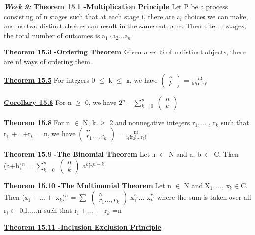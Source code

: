 \documentclass[10pt]{article}
\begin{document}
\par\textbf{\underline{\textit{Week 9:}}}
\textbf{\underline{Theorem 15.1 -Multiplication Principle }}
Let P be a process consisting of n stages such
that at each stage i, there are a$_i$ choices we can make, and no two distinct choices
can result in the same outcome. Then after n stages, the total number of outcomes is
a$_1 · \mbox{a}_2 \dots \mbox{a}_n$.
\par\textbf{\underline{Theorem 15.3 -Ordering Theorem }}
Given a set S of n distinct objects, there are n! ways
of ordering them.
\par\textbf{\underline{Theorem 15.5}}
For integers 0 $\leq$ k $\leq$ n, we have
$\left( \begin{array}{c} n \\ k \end{array} \right)$ = $\frac{\mbox{n}!}{\mbox{k!(n-k)!}}$
\par\textbf{\underline{Corollary 15.6}}
For n $\geq$ 0, we have
2$^n$= $\sum_{k=0}^{n}$ $\left( \begin{array}{c} n \\ k \end{array} \right)$
\par\textbf{\underline{Theorem 15.8}}
For n $\in$ N, k $\geq$ 2 and nonnegative integers r$_1, \dots$ , r$_k$ such that r$_1$ +$\dots$+r$_k$ = n,
we have $\left( \begin{array}{c} n \\ r_1 \dots ,r_k \end{array} \right)$ = $ \frac{\mbox{n!}}{ \mbox{r}_1! \mbox{r}_2! \dots \mbox{r}_k! } $
\par\textbf{\underline{Theorem 15.9 -The Binomial Theorem}}
Let n $\in$ N and a, b $\in$ C. Then
(a+b)$^n$ = $\sum_{k=0}^{n}$ $\left( \begin{array}{c} n \\ k \end{array} \right)$ a$^k$b$^{n-k}$
\par\textbf{\underline{Theorem 15.10 -The Multinomial Theorem}}
Let n $\in$ N and X$_1, \dots$, x$_k \in $C. Then
(x$_1 + \dots +$ x$_k$)$^n$ = $\sum$ $\left( \begin{array}{c} n \\ r_1 \dots ,r_k \end{array} \right)$ x$_1^{r_1} \dots$ x$_k^{r_k}$
where the sum is taken over all r$_i \in $ {0,1,$\dots $,n} such that r$_1 + \dots +$ r$_k$ =n
\par\textbf{\underline{Theorem 15.11 -Inclusion Exclusion Principle}}
\end{document}

